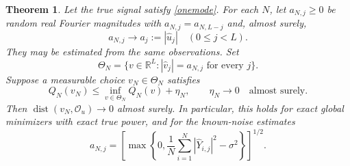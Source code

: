 \documentclass[11pt]{article}
\newtheorem{theorem}{Theorem}
\newcommand{\R}{\mathbb R}
\DeclareMathOperator{\dist}{dist}
\begin{document}
\begin{theorem}\label{consistency}
Let the true signal satisfy \eqref{onemode}. For each $N$, let
$a_{N,j}\geq0$ be random real Fourier magnitudes with
$a_{N,j}=a_{N,L-j}$ and, almost surely,
\[
 a_{N,j}\longrightarrow a_j:=|\widehat u_j|
                       \quad(0\leq j<L).
\]
They may be estimated from the same observations. Set
\[
 \Theta_N=\{v\in\R^L:|\widehat v_j|=a_{N,j}
                                 \text{ for every }j\}.
\]
Suppose a measurable choice $v_N\in\Theta_N$ satisfies
\[
 Q_N(v_N)\leq\inf_{v\in\Theta_N}Q_N(v)+\eta_N,
                         \qquad \eta_N\to0
                         \quad\text{almost surely}.
\]
Then $\dist(v_N,\mathcal O_u)\to0$ almost surely. In particular,
this holds for exact global minimizers with exact true power, and for
the known-noise estimates
\begin{equation}\label{powerestimate}
 a_{N,j}=\left[\max\left\{0,
   \frac1N\sum_{i=1}^N|\widehat Y_{i,j}|^2-\sigma^2
                                      \right\}\right]^{1/2}.
\end{equation}
\end{theorem}
\end{document}
